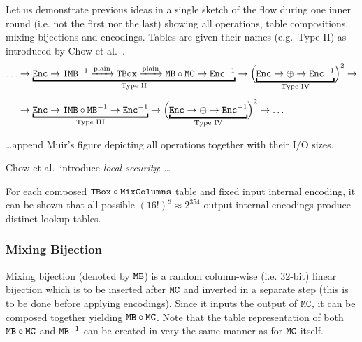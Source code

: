 	Let us demonstrate previous ideas in a single sketch of the flow during one inner round (i.e. not the first nor the last) showing all operations, table compositions, mixing bijections and encodings. Tables are given their names (e.g.\ Type II) as introduced by Chow et al.\ \cite{chow2003aes}.
	\begin{align}
	\label{eq:wbaesflow} %
		\ldots&\rarr\underbracket{\Enc\rarr\IMB^{-1}\xrightarrow{\textnormal{plain}}\TBox\xrightarrow{\textnormal{plain}}\MB\circ\MC\rarr\Enc^{-1}}_{\textnormal{Type II}}\rarr\Bigl(\underbracket{\Enc\rarr\xor\rarr\Enc^{-1}}_{\textnormal{Type IV}}\Bigr)^2\rarr\nonumber\\[.5em]
		&\rarr\underbracket{\Enc\rarr\IMB\circ\MB^{-1}\rarr\Enc^{-1}}_{\textnormal{Type III}}\rarr\Bigl(\underbracket{\Enc\rarr\xor\rarr\Enc^{-1}}_{\textnormal{Type IV}}\Bigr)^2\rarr\ldots
	\end{align}
	
	\ldots append Muir's figure depicting all operations together with their I/O sizes.
	
	\begin{remark}
	\label{rem:localsec}
		Chow et al.\ introduce {\em local security}: \ldots
		
		For each composed $\texttt{TBox}\circ\texttt{MixColumns}$ table and fixed input internal encoding, it can be shown that all possible $(16!)^8 \approx 2^{354}$ output internal encodings produce distinct lookup tables.
	\end{remark}
	

\subsubsection{Mixing Bijection}
	
	Mixing bijection (denoted by $\texttt{MB}$) is a random column-wise (i.e. $32$-bit) linear bijection which is to be inserted after $\texttt{MC}$ and inverted in a separate step (this is to be done before applying encodings). Since it inputs the output of $\texttt{MC}$, it can be composed together yielding $\texttt{MB}\circ\texttt{MC}$. Note that the table representation of both $\texttt{MB}\circ\texttt{MC}$ and $\texttt{MB}^{-1}$ can be created in very the same manner as for $\texttt{MC}$ itself.
	

